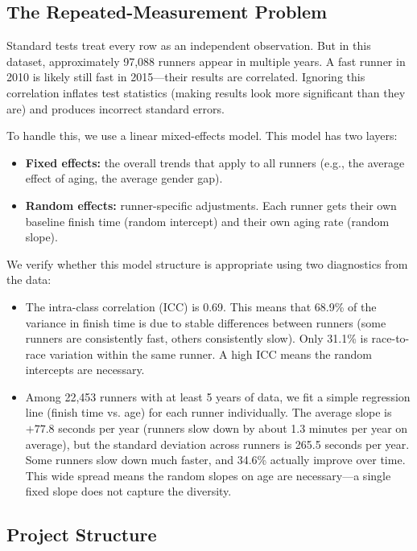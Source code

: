 \documentclass[conference]{IEEEtran}
\begin{document}
\subsection{The Repeated-Measurement Problem}

Standard tests treat every row as an independent observation. But in this dataset, approximately 97,088 runners appear in multiple years. A fast runner in 2010 is likely still fast in 2015---their results are correlated. Ignoring this correlation inflates test statistics (making results look more significant than they are) and produces incorrect standard errors.

To handle this, we use a linear mixed-effects model. This model has two layers:
\begin{itemize}
    \item \textbf{Fixed effects:} the overall trends that apply to all runners (e.g., the average effect of aging, the average gender gap).
    \item \textbf{Random effects:} runner-specific adjustments. Each runner gets their own baseline finish time (random intercept) and their own aging rate (random slope).
\end{itemize}

We verify whether this model structure is appropriate using two diagnostics from the data:
\begin{itemize}
    \item The intra-class correlation (ICC) is 0.69. This means that 68.9\% of the variance in finish time is due to stable differences between runners (some runners are consistently fast, others consistently slow). Only 31.1\% is race-to-race variation within the same runner. A high ICC means the random intercepts are necessary.
    \item Among 22,453 runners with at least 5 years of data, we fit a simple regression line (finish time vs. age) for each runner individually. The average slope is $+77.8$ seconds per year (runners slow down by about 1.3 minutes per year on average), but the standard deviation across runners is 265.5 seconds per year. Some runners slow down much faster, and 34.6\% actually improve over time. This wide spread means the random slopes on age are necessary---a single fixed slope does not capture the diversity.
\end{itemize}

\subsection{Project Structure}
\end{document}
